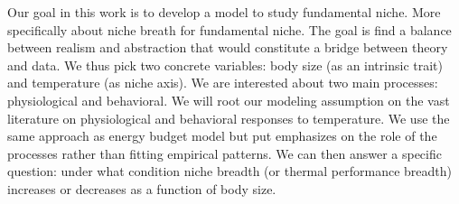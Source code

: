 Our goal in this work is to develop a model to study fundamental niche.
More specifically about niche breath for fundamental niche.
The goal is find a balance between realism and abstraction that would constitute a bridge between theory and data.
We thus pick two concrete variables: body size (as an intrinsic trait) and temperature (as niche axis). 
We are interested about two main processes: physiological and behavioral. %
We will root our modeling assumption on the vast literature on physiological and behavioral responses to temperature. 
We use the same approach as energy budget model but put emphasizes on the role of the processes rather than fitting empirical patterns.%
We can then answer a specific question: under what condition niche breadth (or thermal performance breadth) increases or decreases as a function of body size.



